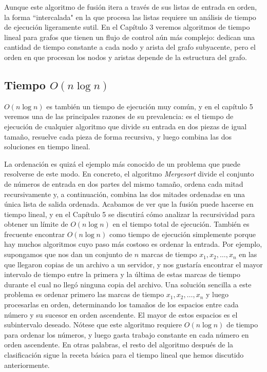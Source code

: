 \documentclass[a4paper, 12pt]{book}
\theoremstyle{dotless}
\begin{document}
Aunque este algoritmo de fusión itera a través de sus listas de entrada en orden, la forma ``intercalada" en la que procesa las listas requiere un análisis de tiempo de ejecución ligeramente sutil. En el Capítulo 3 veremos algoritmos de tiempo lineal para grafos que tienen un flujo de control aún más complejo: dedican una cantidad de tiempo constante a cada nodo y arista del grafo subyacente, pero el orden en que procesan los nodos y aristas depende de la estructura del grafo.

\subsection*{Tiempo $O(n \log n)$ }

$O(n \log n)$ es también un tiempo de ejecución muy común, y en el capítulo 5 veremos una de las principales razones de su prevalencia: es el tiempo de ejecución de cualquier algoritmo que divide su entrada en dos piezas de igual tamaño, resuelve cada pieza de forma recursiva, y luego combina las dos soluciones en tiempo lineal.

La ordenación es quizá el ejemplo más conocido de un problema que puede resolverse de este modo. En concreto, el algoritmo \textit{Mergesort} divide el conjunto de números de entrada en dos partes del mismo tamaño, ordena cada mitad recursivamente y, a continuación, combina las dos mitades ordenadas en una única lista de salida ordenada. Acabamos de ver que la fusión puede hacerse en tiempo lineal, y en el Capítulo 5 se discutirá cómo analizar la recursividad para obtener un límite de $O(n \log n)$ en el tiempo total de ejecución. También es frecuente encontrar $O(n \log n)$ como tiempo de ejecución simplemente porque hay muchos algoritmos cuyo paso más costoso es ordenar la entrada. Por ejemplo, supongamos que nos dan un conjunto de $n$ marcas de tiempo $x_{1}, x_{2}, \ldots, x_{n}$ en las que llegaron copias de un archivo a un servidor, y nos gustaría encontrar el mayor intervalo de tiempo entre la primera y la última de estas marcas de tiempo durante el cual no llegó ninguna copia del archivo. Una solución sencilla a este problema es ordenar primero las marcas de tiempo $x_{1}, x_{2}, \ldots, x_{n}$ y luego procesarlas en orden, determinando los tamaños de los espacios entre cada número y su sucesor en orden ascendente. El mayor de estos espacios es el subintervalo deseado. Nótese que este algoritmo requiere $O(n \log n)$ de tiempo para ordenar los números, y luego gasta trabajo constante en cada número en orden ascendente. En otras palabras, el resto del algoritmo después de la clasificación sigue la receta básica para el tiempo lineal que hemos discutido anteriormente.
\end{document}
